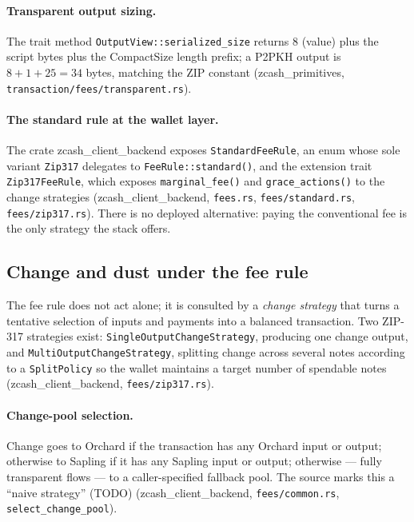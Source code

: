 \documentclass[11pt,a4paper]{article}
\theoremstyle{definition}
\begin{document}
\paragraph{Transparent output sizing.} The trait method
\texttt{OutputView::serialized\_size} returns $8$ (value) plus the script
bytes plus the CompactSize length prefix; a P2PKH output is
$8 + 1 + 25 = 34$ bytes, matching the ZIP constant
(\textsf{zcash\_primitives}, \texttt{transaction/fees/transparent.rs}).

\paragraph{The standard rule at the wallet layer.} The crate
\textsf{zcash\_client\_backend} exposes \texttt{StandardFeeRule}, an enum
whose sole variant \texttt{Zip317} delegates to
\texttt{FeeRule::standard()}, and the extension trait
\texttt{Zip317FeeRule}, which exposes \texttt{marginal\_fee()} and
\texttt{grace\_actions()} to the change strategies
(\textsf{zcash\_client\_backend}, \texttt{fees.rs},
\texttt{fees/standard.rs}, \texttt{fees/zip317.rs}). There is no deployed
alternative: paying the conventional fee is the only strategy the stack
offers.

\subsection{Change and dust under the fee rule}\label{sec:fees-change}

The fee rule does not act alone; it is consulted by a \emph{change
strategy} that turns a tentative selection of inputs and payments into a
balanced transaction. Two ZIP-317 strategies exist:
\texttt{SingleOutputChangeStrategy}, producing one change output, and
\texttt{MultiOutputChangeStrategy}, splitting change across several notes
according to a \texttt{SplitPolicy} so the wallet maintains a target number
of spendable notes (\textsf{zcash\_client\_backend},
\texttt{fees/zip317.rs}).

\paragraph{Change-pool selection.} Change goes to Orchard if the
transaction has any Orchard input or output; otherwise to Sapling if it has
any Sapling input or output; otherwise --- fully transparent flows --- to a
caller-specified fallback pool. The source marks this a ``naive strategy''
(TODO) (\textsf{zcash\_client\_backend}, \texttt{fees/common.rs},
\texttt{select\_change\_pool}).
\end{document}
